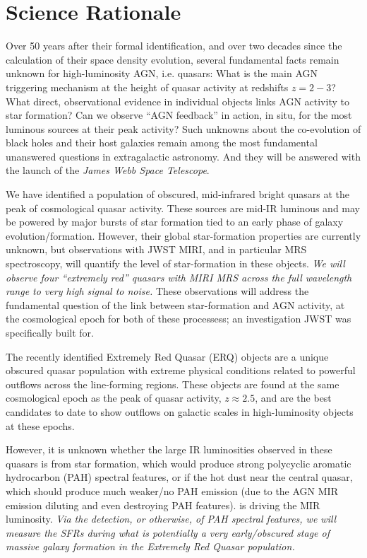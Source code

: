 \section*{Science Rationale}
\vspace{-6pt}
\noindent
Over 50 years after their formal identification, and over two decades
since the calculation of their space density evolution, several
fundamental facts remain unknown for high-luminosity AGN,
i.e. quasars: What is the main AGN triggering mechanism at the height
of quasar activity at redshifts $z=2-3$? What direct,
observational evidence in individual objects links AGN activity
to star formation?  Can we observe ``AGN feedback'' in action, in situ,  
for the most luminous sources at their peak activity? 
Such unknowns about the co-evolution of black holes and their host
galaxies remain among the most fundamental unanswered questions in
extragalactic astronomy.
And they will be answered with the launch of the {\it James Webb Space
Telescope}.

\smallskip \smallskip
\noindent
We have identified a population of obscured, mid-infrared bright
quasars at the peak of cosmological quasar activity.  These sources are
mid-IR luminous and may be powered by major bursts of star formation
tied to an early phase of galaxy evolution/formation. However, their
global star-formation properties are currently unknown, but
observations with JWST MIRI, and in particular MRS spectroscopy, will
quantify the level of star-formation in these objects.  {\it We will
observe four ``extremely red'' quasars with MIRI MRS across the full wavelength range to
very high signal to noise.} These observations will address the
fundamental question of the link between star-formation and AGN
activity, at the cosmological epoch for both of these processess; an
investigation JWST was specifically built for.

\smallskip \smallskip
\noindent
The recently identified Extremely Red Quasar (ERQ) objects are a
unique obscured quasar population with extreme physical conditions
related to powerful outflows across the line-forming regions. These
objects are found at the same cosmological epoch as the peak of quasar
activity, $z\approx2.5$, and are the best candidates to date to show
outflows on galactic scales in high-luminosity objects at these epochs. 

\smallskip \smallskip
\noindent
However, it is unknown whether the large IR luminosities observed in
these quasars is from star formation, which would produce strong
polycyclic aromatic hydrocarbon (PAH) spectral features, or if the hot
dust near the central quasar, which should produce much weaker/no PAH
emission (due to the AGN MIR emission diluting and even destroying PAH
features).  is driving the MIR luminosity.
{\it Via the detection, or otherwise, of PAH spectral features, we will 
measure the SFRs during what is potentially a very early/obscured stage 
of massive galaxy formation in the Extremely Red Quasar population.}

